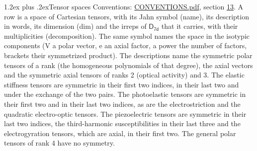 \documentclass[10pt,a4paper]{article}
\makeatletter
\renewcommand\section{\@startsection{section}{1}{\z@}{-3ex plus -1ex minus -.2ex}%
  {1.2ex plus .2ex}{\normalfont\large\sffamily\bfseries\color{parttitle}}}
\numberwithin{equation}{section}
\newcommand{\grp}[1]{\mathsf{#1}}
\makeatother
\begin{document}
\section{Tensor spaces}\label{s:tensor_spaces}
Conventions: \href{../../CONVENTIONS.pdf}{CONVENTIONS.pdf}, section \href{../../CONVENTIONS.pdf\#conv.13}{13}.
\leavevmode\label{n:head.name}\label{n:head.description}\label{n:head.dim}\label{n:head.decomposition}A row is a space of Cartesian tensors, with its Jahn symbol (name), its description in words, its dimension (dim) and the irreps of $\grp{D_{7d}}$ that it carries, with their multiplicities (decomposition). \label{n:label.jahn}The same symbol names the space in the isotypic components (V a polar vector, e an axial factor, a power the number of factors, brackets their symmetrized product). The descriptions name the symmetric polar tensors of a rank (the homogeneous polynomials of that degree), the axial vectors and the symmetric axial tensors of ranks 2 (optical activity) and 3. The elastic stiffness tensors are symmetric in their first two indices, in their last two and under the exchange of the two pairs. The photoelastic tensors are symmetric in their first two and in their last two indices, as are the electrostriction and the quadratic electro-optic tensors. The piezoelectric tensors are symmetric in their last two indices, the third-harmonic susceptibilities in their last three and the electrogyration tensors, which are axial, in their first two. The general polar tensors of rank 4 have no symmetry.
\end{document}
